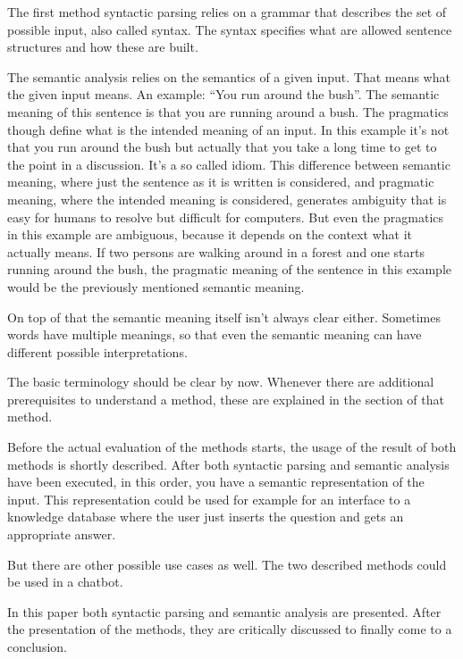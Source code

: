 \documentclass[12pt,twoside]{scrartcl}
\theoremstyle{plain}
\theoremstyle{definition}
\theoremstyle{remark}
\begin{document}
	The first method syntactic parsing relies on a grammar that describes the set of possible input, also called syntax. The syntax specifies what are allowed sentence structures and how these are built.
	
	The semantic analysis relies on the semantics of a given input. That means what the given input means. An example: ``You run around the bush''. The semantic meaning of this sentence is that you are running around a bush. 
	The pragmatics though define what is the intended meaning of an input. In this example it's not that you run around the bush but actually that you take a long time to get to the point in a discussion. It's a so called idiom. This difference between semantic meaning, where just the sentence as it is written is considered, and pragmatic meaning, where the intended meaning is considered, generates ambiguity that is easy for humans to resolve but difficult for computers. But even the pragmatics in this example are ambiguous, because it depends on the context what it actually means. If two persons are walking around in a forest and one starts running around the bush, the pragmatic meaning of the sentence in this example would be the previously mentioned semantic meaning.
	
	On top of that the semantic meaning itself isn't always clear either. Sometimes words have multiple meanings, so that even the semantic meaning can have different possible interpretations.
	
	The basic terminology should be clear by now. Whenever there are additional prerequisites to understand a method, these are explained in the section of that method.
	
	Before the actual evaluation of the methods starts, the usage of the result of both methods is shortly described. After both syntactic parsing and semantic analysis have been executed, in this order, you have a semantic representation of the input. This representation could be used for example for an interface to a knowledge database where the user just inserts the question and gets an appropriate answer.
	
	But there are other possible use cases as well. The two described methods could be used in a chatbot.
	
	
	In this paper both syntactic parsing and semantic analysis are presented. After the presentation of the methods, they are critically discussed to finally come to a conclusion.
\end{document}
